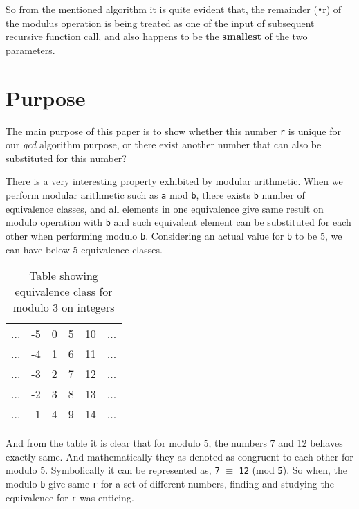 \documentclass[12pt]{article}
\begin{document}
So from the mentioned algorithm it is quite evident that, the remainder (\texttt{•}{r}) of the modulus operation is being treated as one of the input of subsequent recursive function call, and also happens to be the \textbf{smallest} of the two parameters.

\section{Purpose}
The main purpose of this paper is to show whether this number \texttt{r} is unique for our \textit{gcd} algorithm purpose, or there exist another number that can also be substituted for this number?

There is a very interesting property exhibited by modular arithmetic.
When we perform modular arithmetic such as \texttt{a} mod \texttt{b}, there exists
\texttt{b} number of equivalence classes, and all elements in one equivalence give same result on modulo operation with \texttt{b} and such equivalent element can be substituted for each other when performing modulo \texttt{b}.
\newline
Considering an actual value for \texttt{b} to be 5, we can have below 5 equivalence classes.

\begin{table}[h!]
\centering
	\begin{tabular}{c c c c c c}
		... & -5 & 0 & 5 & 10 & ... \\
		... & -4 & 1 & 6 & 11 & ... \\
		... & -3 & 2 & 7 & 12 & ... \\
		... & -2 & 3 & 8 & 13 & ... \\
		... & -1 & 4 & 9 & 14 & ...
	\end{tabular}
\caption{Table showing equivalence class for modulo 3 on integers}
\label{table:1}
\end{table}

And from the table it is clear that for modulo 5, the numbers 7 and 12 behaves exactly same. And mathematically they as denoted as congruent to each other for modulo 5.
Symbolically it can be represented as, \texttt{7} $\equiv$ \texttt{12} (mod \texttt{5}).
So when, the modulo \texttt{b} give same \texttt{r} for a set of different numbers, finding and studying the equivalence for \texttt{r} was enticing.
\end{document}
